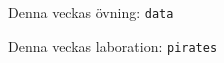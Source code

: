 \begin{Slide}{Denna veckas övning: \texttt{data}}
\begin{itemize}\SlideFontTiny

\end{itemize}
\end{Slide}

\begin{Slide}{Denna veckas laboration: \texttt{pirates}}
\begin{itemize}\SlideFontSmall

\end{itemize}
\end{Slide}

\fi




